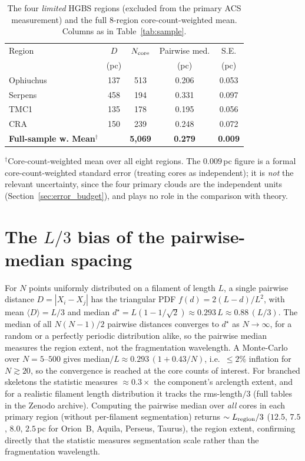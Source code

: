 \documentclass[usenatbib,twoside,twocolumn]{mnras}
\begin{document}
\begin{table}
\caption{The four \emph{limited} HGBS regions (excluded from the primary ACS measurement) and the full 8-region core-count-weighted mean. Columns as in Table~\ref{tab:sample}.}
\label{tab:sample_limited}
\footnotesize
\setlength{\tabcolsep}{3pt}
\begin{tabular}{lcccc}
\toprule
Region & $D$ & $N_{\rm core}$ & Pairwise med. & S.E. \\
       & (pc) &  & (pc) & (pc) \\
\midrule
Ophiuchus& 137 & 513   & 0.206 & 0.053 \\
Serpens  & 458 & 194   & 0.331 & 0.097 \\
TMC1     & 135 & 178   & 0.195 & 0.056 \\
CRA      & 150 & 239   & 0.248 & 0.072 \\
\midrule
\textbf{Full-sample w. Mean}$^\dagger$ &  & \textbf{5,069} & \textbf{0.279} & \textbf{0.009} \\
\bottomrule
\end{tabular}
\par\vspace{2pt}
\footnotesize $^\dagger$Core-count-weighted mean over all eight regions. The $0.009$\,pc figure is a formal core-count-weighted standard error (treating cores as independent); it is \emph{not} the relevant uncertainty, since the four primary clouds are the independent units (Section~\ref{sec:error_budget}), and plays no role in the comparison with theory.
\end{table}

\section{The $L/3$ bias of the pairwise-median spacing}
\label{sec:pwmedian}
For $N$ points uniformly distributed on a filament of length $L$, a single pairwise distance $D=|X_i-X_j|$ has the triangular PDF $f(d)=2(L-d)/L^2$, with mean $\langle D\rangle=L/3$ and median $d^\star=L(1-1/\sqrt{2})\approx0.293\,L\approx0.88\,(L/3)$. The median of all $N(N-1)/2$ pairwise distances converges to $d^\star$ as $N\to\infty$, for a random or a perfectly periodic distribution alike, so the pairwise median measures the region extent, not the fragmentation wavelength. A Monte-Carlo over $N=5$--$500$ gives median$/L\approx0.293\,(1+0.43/N)$, i.e.\ $\le2\%$ inflation for $N\gtrsim20$, so the convergence is reached at the core counts of interest. For branched skeletons the statistic measures $\approx0.3\times$ the component's arclength extent, and for a realistic filament length distribution it tracks the rms-length$/3$ (full tables in the Zenodo archive). Computing the pairwise median over \emph{all} cores in each primary region (without per-filament segmentation) returns $\sim L_{\rm region}/3$ ($12.5$, $7.5$, $8.0$, $2.5$\,pc for Orion~B, Aquila, Perseus, Taurus), the region extent, confirming directly that the statistic measures segmentation scale rather than the fragmentation wavelength.
\end{document}
